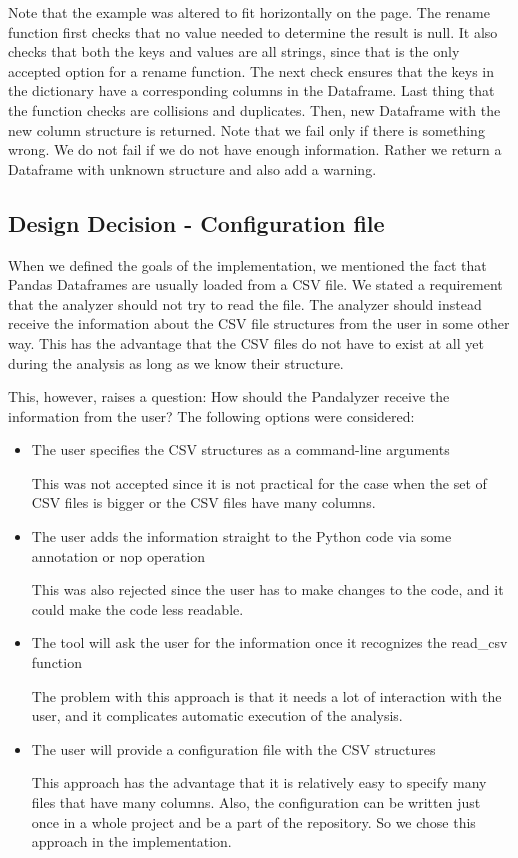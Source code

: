 Note that the example was altered to fit horizontally on the page.
The rename function first checks that no value needed to determine the result is null.
It also checks that both the keys and values are all strings, since that is the only accepted option for a rename
function.
The next check ensures that the keys in the dictionary have a corresponding columns in the Dataframe.
Last thing that the function checks are collisions and duplicates.
Then, new Dataframe with the new column structure is returned.
Note that we fail only if there is something wrong.
We do not fail if we do not have enough information.
Rather we return a Dataframe with unknown structure and also add a warning.

\subsection{Design Decision - Configuration file}\label{subsec:configuration-file}

When we defined the goals of the implementation, we mentioned the fact that Pandas Dataframes are usually loaded
from a CSV file.
We stated a requirement that the analyzer should not try to read the file.
The analyzer should instead receive the information about the CSV file structures from the user in some other way.
This has the advantage that the CSV files do not have to exist at all yet during the analysis as long as we know their
structure.

This, however, raises a question: How should the Pandalyzer receive the information from the user?
The following options were considered:
\begin{itemize}
    \item The user specifies the CSV structures as a command-line arguments

    This was not accepted since it is not practical for the case when the set of CSV files is bigger or the CSV files
    have many columns.

    \item The user adds the information straight to the Python code via some annotation or nop operation

    This was also rejected since the user has to make changes to the code, and it could make the code less readable.

    \item The tool will ask the user for the information once it recognizes the read\_csv function

    The problem with this approach is that it needs a lot of interaction with the user, and it complicates automatic
    execution of the analysis.

    \item The user will provide a configuration file with the CSV structures

    This approach has the advantage that it is relatively easy to specify many files that have many columns.
    Also, the configuration can be written just once in a whole project and be a part of the repository.
    So we chose this approach in the implementation.
\end{itemize}

